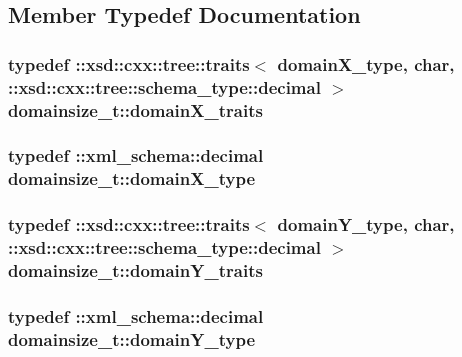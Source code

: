 \subsection{Member Typedef Documentation}
\hypertarget{classdomainsize__t_ab85fcf810949f1a467f81f0f7f443eb4}{
\subsubsection[{domain\-X\-\_\-traits}]{\setlength{\rightskip}{0pt plus 5cm}typedef \-::xsd\-::cxx\-::tree\-::traits$<$ {\bf domain\-X\-\_\-type}, char, \-::xsd\-::cxx\-::tree\-::schema\-\_\-type\-::decimal $>$ {\bf domainsize\-\_\-t\-::domain\-X\-\_\-traits}}}\label{classdomainsize__t_ab85fcf810949f1a467f81f0f7f443eb4}
\hypertarget{classdomainsize__t_a854a03c90869763fcf75511fadb5caef}{
\subsubsection[{domain\-X\-\_\-type}]{\setlength{\rightskip}{0pt plus 5cm}typedef \-::{\bf xml\-\_\-schema\-::decimal} {\bf domainsize\-\_\-t\-::domain\-X\-\_\-type}}}\label{classdomainsize__t_a854a03c90869763fcf75511fadb5caef}
\hypertarget{classdomainsize__t_a4a4de85f17a3ad6f88f1ee94df83eba5}{
\subsubsection[{domain\-Y\-\_\-traits}]{\setlength{\rightskip}{0pt plus 5cm}typedef \-::xsd\-::cxx\-::tree\-::traits$<$ {\bf domain\-Y\-\_\-type}, char, \-::xsd\-::cxx\-::tree\-::schema\-\_\-type\-::decimal $>$ {\bf domainsize\-\_\-t\-::domain\-Y\-\_\-traits}}}\label{classdomainsize__t_a4a4de85f17a3ad6f88f1ee94df83eba5}
\hypertarget{classdomainsize__t_a668c8a71e21505b0ad029fa62f996085}{
\subsubsection[{domain\-Y\-\_\-type}]{\setlength{\rightskip}{0pt plus 5cm}typedef \-::{\bf xml\-\_\-schema\-::decimal} {\bf domainsize\-\_\-t\-::domain\-Y\-\_\-type}}}\label{classdomainsize__t_a668c8a71e21505b0ad029fa62f996085}
